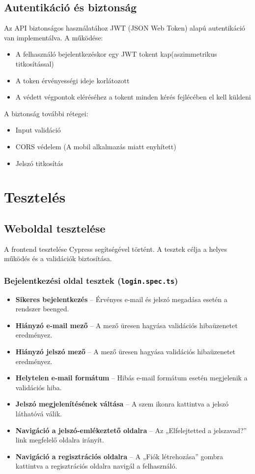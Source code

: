 \documentclass[12pt]{report}
\begin{document}
\section{Autentikáció és biztonság}
Az API biztonságos használatához JWT (JSON Web Token) alapú autentikáció van implementálva. A működése:
\begin{itemize}
  \item A felhasználó bejelentkezéskor egy JWT tokent kap(aszimmetrikus titkosítással)
  \item A token érvényességi ideje korlátozott
  \item A védett végpontok eléréséhez a tokent minden kérés fejlécében el kell küldeni
\end{itemize}

A biztonság további rétegei:
\begin{itemize}
  \item Input validáció
  \item CORS védelem (A mobil alkalmazás miatt enyhített)
  \item Jelszó titkosítás
\end{itemize}

\chapter{Tesztelés}
\section{Weboldal tesztelése}
A frontend tesztelése Cypress segítségével történt. A tesztek célja a helyes működés és a validációk biztosítása.

\subsection{Bejelentkezési oldal tesztek (\texttt{login.spec.ts})}

\begin{itemize}
  \item \textbf{Sikeres bejelentkezés} – Érvényes e-mail és jelszó megadása esetén a rendszer beenged.
  \item \textbf{Hiányzó e-mail mező} – A mező üresen hagyása validációs hibaüzenetet eredményez.
  \item \textbf{Hiányzó jelszó mező} – A mező üresen hagyása validációs hibaüzenetet eredményez.
  \item \textbf{Helytelen e-mail formátum} – Hibás e-mail formátum esetén megjelenik a validációs hiba.
  \item \textbf{Jelszó megjelenítésének váltása} – A szem ikonra kattintva a jelszó láthatóvá válik.
  \item \textbf{Navigáció a jelszó-emlékeztető oldalra} – Az „Elfelejtetted a jelszavad?” link megfelelő oldalra irányít.
  \item \textbf{Navigáció a regisztrációs oldalra} – A „Fiók létrehozása” gombra kattintva a regisztrációs oldalra navigál a felhasználó.
\end{itemize}
\end{document}

